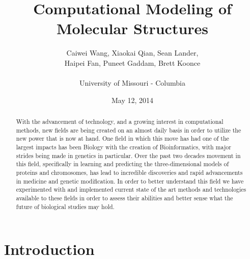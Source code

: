 \documentclass{article}
\title{Computational Modeling of Molecular Structures}
\author{Caiwei Wang, Xiaokai Qian, Sean Lander, \\Haipei Fan, Puneet Gaddam, Brett Koonce\\\\University of Missouri - Columbia}
\date{May 12, 2014}
\begin{document}
\maketitle

\begin{abstract}

With the advancement of technology, and a growing interest in computational methods, new fields are being created on an almost daily basis in order to utilize the new power that is now at hand. One field in which this move has had one of the largest impacts has been Biology with the creation of Bioinformatics, with major strides being made in genetics in particular. Over the past two decades movement in this field, specifically in learning and predicting the three-dimensional models of proteins and chromosomes, has lead to incredible discoveries and rapid advancements in medicine and genetic modification. In order to better understand this field we have experimented with and implemented current state of the art methods and technologies available to these fields in order to assess their abilities and better sense what the future of biological studies may hold.

\end{abstract}

\section{Introduction}
\end{document}
